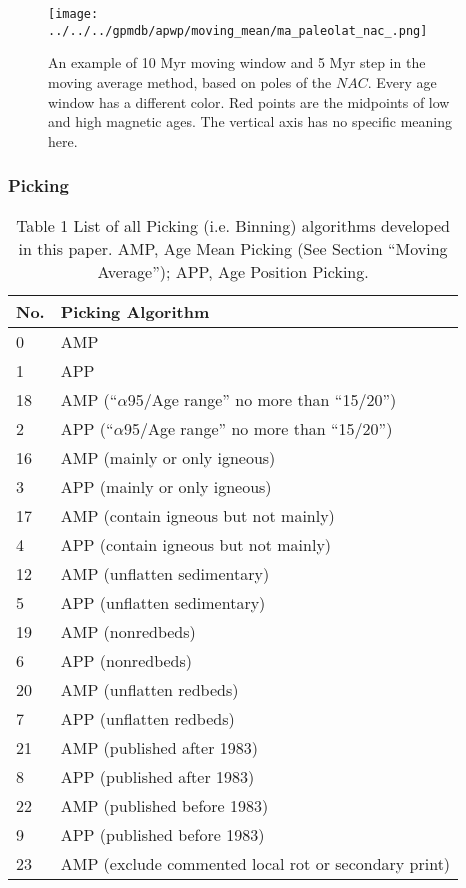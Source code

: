 \begin{figure*}
\centering
\texttt{[image: ../../../gpmdb/apwp/moving\_mean/ma\_paleolat\_nac\_.png]}
\caption[Moving average (MA) methods]{An example of 10 Myr moving window and 5
Myr step in the moving average method, based on poles of the $NAC$. Every age
window has a different color. Red points are the midpoints of low and high
magnetic ages. The vertical axis has no specific meaning here.
}\label{fig-nac-maplat}
\end{figure*}

\subsubsection{Picking}

\begin{table}
\centering
\caption{Table 1 List of all Picking (i.e. Binning) algorithms developed in this
         paper. AMP, Age Mean Picking (See Section ``Moving Average''); APP, Age
         Position Picking.}\label{tab-pick}
\begin{tabular}{@{}ll@{}}
\toprule
No. & Picking Algorithm \\ \midrule
0 & AMP \\
1 & APP \\
18 & AMP (``$\alpha$95/Age range'' no more than ``15/20'') \\
2 & APP (``$\alpha$95/Age range'' no more than ``15/20'') \\
16 & AMP (mainly or only igneous) \\
3 & APP (mainly or only igneous) \\
17 & AMP (contain igneous but not mainly) \\
4 & APP (contain igneous but not mainly) \\
12 & AMP (unflatten sedimentary) \\
5 & APP (unflatten sedimentary) \\
19 & AMP (nonredbeds) \\
6 & APP (nonredbeds) \\
20 & AMP (unflatten redbeds) \\
7 & APP (unflatten redbeds) \\
21 & AMP (published after 1983) \\
8 & APP (published after 1983) \\
22 & AMP (published before 1983) \\
9 & APP (published before 1983) \\
23 & AMP (exclude commented local rot or secondary print) \\

\end{tabular}
\end{table}
